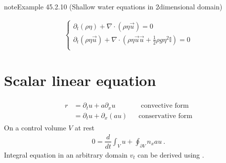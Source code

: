 \documentclass[letterpaper,10pt,english]{jupyterBook}
\begin{document}
\label{ch/pde/hyperbolic-dimensions:example-9}
\begin{sphinxadmonition}{note}{Example 45.2.10 (Shallow water equations in 2\sphinxhyphen{}dimensional domain)}


\begin{equation*}
\begin{split}\begin{cases}
  \partial_t (\rho \eta) + \nabla \cdot (\rho \eta \vec{u}) = 0 \\
  \partial_t (\rho \eta \vec{u}) + \nabla \cdot \left(\rho \eta \vec{u} \vec{u} + \frac{1}{2} \rho g \eta^2 \mathbb{I} \right) = 0 \\
\end{cases}\end{split}
\end{equation*}\end{sphinxadmonition}

\sphinxstepscope


\section{Scalar linear equation}
\label{\detokenize{ch/pde/hyperbolic-1d-scalar-linear:scalar-linear-equation}}\label{\detokenize{ch/pde/hyperbolic-1d-scalar-linear:pde-hyperbolic-problems-1d-scalar-linear}}\label{\detokenize{ch/pde/hyperbolic-1d-scalar-linear::doc}}
\sphinxAtStartPar
{}
\begin{equation*}
\begin{split}\begin{aligned}
  r
  & = \partial_t u + a \partial_x u      && \text{  convective form}   \\
  & = \partial_t u + \partial_x ( a u )  && \text{conservative form}
\end{aligned}\end{split}
\end{equation*}
\sphinxAtStartPar
{} On a control volume \(V\) at rest
\begin{equation*}
\begin{split}0 = \dfrac{d}{dt} \int_V u + \oint_{\partial V} n_x a u \ .\end{split}
\end{equation*}
\sphinxAtStartPar
Integral equation in an arbitrary domain \(v_t\) can be derived using {\hyperref[\detokenize{ch/tensor-algebra-calculus/time-derivative-of-integrals:tensor-calculus-time-derivative-of-integrals-volume-density}]{}}.
\end{document}
